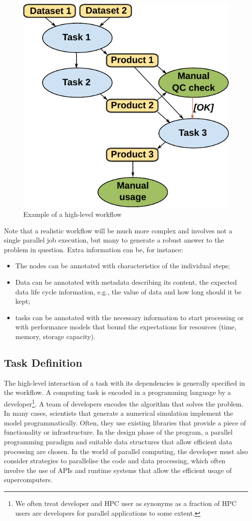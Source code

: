 \documentclass[a4paper]{article}
\begin{document}
{{\begin{figure}[H]
  \centering
  \includegraphics[width=0.4\columnwidth]{workflow}
  \caption{Example of a high-level workflow}
  \label{fig:workflow}
\end{figure}

Note that a realistic workflow will be much more complex and involves not a single parallel job execution, but many to generate a robust answer to the problem in question. Extra information can be, for instance:

\begin{itemize}

\item The nodes can be annotated with characteristics of the individual steps;

\item Data can be annotated with metadata describing its content, the expected data life cycle information, e.g., the value of data and how long should it be kept;

\item tasks can be annotated with the necessary information to start processing or with performance models that bound the expectations for resources (time, memory, storage capacity).

\end{itemize}

\subsection{Task Definition}

The high-level interaction of a task with its dependencies is generally specified in the workflow.
A computing task is encoded in a programming language by a developer\footnote{We often treat developer and HPC user as synonyms as a fraction of HPC users are developers for parallel applications to some extent.}.
A team of developers encodes the algorithm that solves the problem. In many cases, scientists that generate a numerical simulation implement the model programmatically.
Often, they use existing libraries that provide a piece of functionality or infrastructure.
In the design phase of the program, a parallel programming paradigm and suitable data structures that allow efficient data processing are chosen.
In the world of parallel computing, the developer must also consider strategies to parallelise the code and data processing, which often involve the use of APIs and runtime systems that allow the efficient usage of supercomputers.

}}
\end{document}
